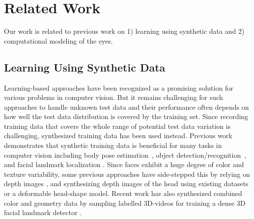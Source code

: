 
\section{Related Work}

Our work is related to previous work on 1) learning using synthetic data and 2) computational modeling of the eyes.

\subsection{Learning Using Synthetic Data}

Learning-based approaches have been recognized as a promising solution for various problems in computer vision.
But it remains challenging for such approaches to handle unknown test data and their performance often depends on how well the test data distribution is covered by the training set.
Since recording training data that covers the whole range of potential test data variation is challenging,
synthesized training data has been used instead.
Previous work demonstrates that synthetic training data is beneficial for many tasks in computer vision including body pose estimation~\cite{okada2008relevant,shotton2013real}, object detection/recognition~\cite{fu2011neural,yu2010improving,liebelt2010multiview,peng2014exploring}, and facial landmark localization \cite{baltrusaitis20123d,zface}.
%
Since faces exhibit a huge degree of color and texture variability, some previous approaches have side-stepped this by relying on depth images \cite{baltrusaitis20123d,fanelli2011real}, and synthesizing depth images of the head using existing datasets or a deformable head-shape model. Recent work has also synthesized combined color and geometry data by sampling labelled 3D-videos for training a dense 3D facial landmark detector \cite{zface}.

